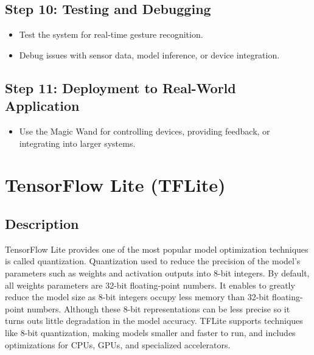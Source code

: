 \subsection{Step 10: Testing and Debugging}
\begin{itemize}
	\item Test the system for real-time gesture recognition.
	\item Debug issues with sensor data, model inference, or device integration.
\end{itemize}

\subsection{Step 11: Deployment to Real-World Application}
\begin{itemize}
	\item Use the Magic Wand for controlling devices, providing feedback, or integrating into larger systems.
\end{itemize}

\section{TensorFlow Lite (TFLite)}
\subsection{Description}
TensorFlow Lite provides one of the most popular model optimization techniques is called quantization. Quantization used to reduce the precision of the model’s parameters such as weights and activation outputs into 8-bit integers.\cite{tensorflowlite:2025} By default, all weights parameters are 32-bit floating-point numbers. It enables to greatly reduce the model size as 8-bit integers occupy less memory than 32-bit floating-point numbers. Although these 8-bit representations can be less precise so it turns outs little degradation in the model accuracy. TFLite supports techniques like 8-bit quantization, making models smaller and faster to run, and includes optimizations for CPUs, GPUs, and specialized accelerators.\cite{tensorflowlite:2025}


